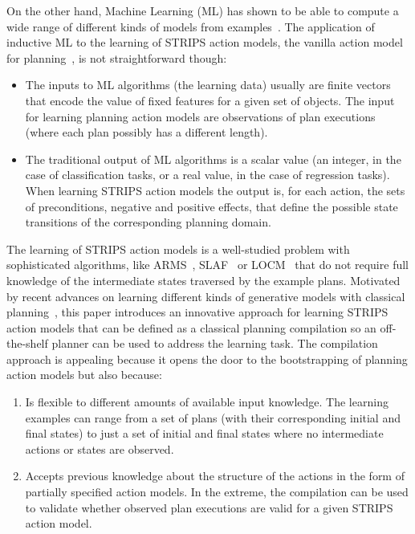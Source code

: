 \documentclass[letterpaper]{article} %
\begin{document}
On the other hand, Machine Learning (ML) has shown to be able to compute a wide range of different kinds of models from examples~\cite{michalski2013machine}. The application of inductive ML to the learning of STRIPS action models, the vanilla action model for planning~\cite{fikes1971strips}, is not straightforward though:
\begin{itemize}
\item The inputs to ML algorithms (the learning data) usually are finite vectors that encode the value of fixed features for a given set of objects. The input for learning planning action models are observations of plan executions (where each plan possibly has a different length).
\item The traditional output of ML algorithms is a scalar value (an integer, in the case of classification tasks, or a real value, in the case of regression tasks). When learning STRIPS action models the output is, for each action, the sets of preconditions, negative and positive effects, that define the possible state transitions of the corresponding planning domain. 
\end{itemize}

The learning of STRIPS action models is a well-studied problem with sophisticated algorithms, like {\sc ARMS}~\cite{yang2007learning}, {\sc SLAF}~\cite{amir:alearning:JAIR08} or {\sc LOCM}~\cite{cresswell2013acquiring} that do not require full knowledge of the intermediate states traversed by the example plans. Motivated by recent advances on learning different kinds of generative models with classical planning~\cite{bonet2009automatic,segovia2016hierarchical,segovia2017generating}, this paper introduces an innovative approach for learning STRIPS action models that can be defined as a classical planning compilation so an off-the-shelf planner can be used to address the learning task. The compilation approach is appealing because it opens the door to the bootstrapping of planning action models but also because:
\begin{enumerate}
\item Is flexible to different amounts of available input knowledge. The learning examples can range from a set of plans (with their corresponding initial and final states) to just a set of initial and final states where no intermediate actions or states are observed.
\item Accepts previous knowledge about the structure of the actions in the form of partially specified action models. In the extreme, the compilation can be used to validate whether observed plan executions are valid for a given STRIPS action model.
\end{enumerate}
\end{document}
